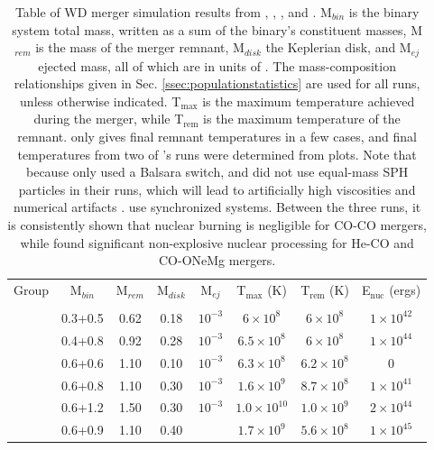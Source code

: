 \begin{table}
\centering
\caption{Table of WD merger simulation results from \cite{guerig04}, \cite{loreig09}, \cite{yoonpr07}, \cite{pakm+10} and \cite{dan+11}.  M$_{bin}$ is the binary system total mass, written as a sum of the binary's constituent masses, M$_{rem}$ is the mass of the merger remnant, M$_{disk}$ the Keplerian disk, and M$_{ej}$ ejected mass, all of which are in units of {\Msun}.  The mass-composition relationships given in Sec. \ref{ssec:populationstatistics} are used for all runs, unless otherwise indicated.  T$_\mathrm{max}$ is the maximum temperature achieved during the merger, while T$_\mathrm{rem}$ is the maximum temperature of the remnant.  \citeauthor{guerig04} only gives final remnant temperatures in a few cases, and final temperatures from two of \citeauthor{dan+11}'s runs were determined from plots.  Note that because \citeauthor{guerig04} only used a Balsara switch, and did not use equal-mass SPH particles in their runs, which will lead to artificially high viscosities and numerical artifacts \cite{loreig09}.  \citeauthor{dan+11} use synchronized systems.  Between the three runs, it is consistently shown that nuclear burning is negligible for CO-CO mergers, while \citeauthor{loreig09} found significant non-explosive nuclear processing for He-CO and CO-ONeMg mergers.}
\begin{tabular}{cccccccc}
\hline & \\[-1em]\hline
Group & M$_{bin}$ & M$_{rem}$ & M$_{disk}$ & M$_{ej}$ & T$_\mathrm{max}$ (K) & T$_\mathrm{rem}$ (K) & E$_\mathrm{nuc}$ (ergs)\\
\hline & \\[-1em]\hline
\citeauthor{loreig09}	& 0.3+0.5	& 0.62 & 0.18 & $10^{-3}$ & $6 \times 10^{8}$ & $6 \times 10^{8}$ & $1 \times 10^{42}$ \\
	& 0.4+0.8	& 0.92 & 0.28 & $10^{-3}$ & $6.5 \times 10^{8}$ & $6 \times 10^{8}$ & $1 \times 10^{44}$ \\
	& 0.6+0.6	& 1.10 & 0.10 & $10^{-3}$ & $6.3 \times 10^{8}$ & $6.2 \times 10^{8}$ & 0 \\
	& 0.6+0.8	& 1.10 & 0.30 & $10^{-3}$ & $1.6 \times 10^{9}$ & $8.7 \times 10^{8}$ & $1 \times 10^{41}$ \\
	& 0.6+1.2	& 1.50 & 0.30 & $10^{-3}$ & $1.0 \times 10^{10}$ & $1.0 \times 10^{9}$ & $2 \times 10^{44}$ \\
\hline
\citeauthor{yoonpr07}	& 0.6+0.9 & 1.10 & 0.40 & & $1.7 \times 10^{9}$ & $5.6 \times 10^{8}$ & $1 \times 10^{45}$ \\

\end{tabular}
\end{table}
